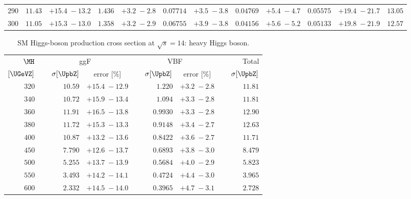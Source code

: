 \begin{landscape}
\begin{table}
\begin{center}
\begin{tabular}{r|rc|rc|rc|rc|rc|r}
 $ 290$ & $  11.43$ & $ +15.4 \; -\!13.2$ & $  1.436$ & $ +3.2 \; -\!2.8$ & $0.07714$ & $ +3.5 \; -\!3.8$ & $0.04769$ & $ +5.4 \; -\!4.7$ & $ 0.05575$ & $ +19.4 \; -\!21.7$ & $     13.05$ \\ 
 $ 300$ & $  11.05$ & $ +15.3 \; -\!13.0$ & $  1.358$ & $ +3.2 \; -\!2.9$ & $0.06755$ & $ +3.9 \; -\!3.8$ & $0.04156$ & $ +5.6 \; -\!5.2$ & $ 0.05133$ & $ +19.8 \; -\!21.9$ & $     12.57$ \\ 
\hline
	\end{tabular}
	\label{tab:XS14a}
	\end{center}
\end{table}
\end{landscape}


\begin{landscape}
\begin{table}
  \begin{center}
	\caption{SM Higgs-boson production cross section at 
	$\sqrt{s}=14$\UTeV: heavy Higgs boson.}    
    \small
	\begin{tabular}{r|rc|rc|r}
\hline
$\MH$ & \multicolumn{2}{c|}{ggF} & \multicolumn{2}{c|}{VBF} &  Total \\
$[\UGeVZ]$ & $~~~~\sigma [\UpbZ]$  & error [\%]
	       & $~~~~\sigma [\UpbZ]$  & error [\%]
	       & $~~~~\sigma [\UpbZ]$ \\
\hline
 $ 320$ & $  10.59$ & $ +15.4 \; -\!12.9$ & $  1.220$ & $ +3.2 \; -\!2.8$   & $      11.81$ \\ 
 $ 340$ & $  10.72$ & $ +15.9 \; -\!13.4$ & $  1.094$ & $ +3.3 \; -\!2.8$   & $      11.81$ \\ 
 $ 360$ & $  11.91$ & $ +16.5 \; -\!13.8$ & $ 0.9930$ & $ +3.3 \; -\!2.8$   & $      12.90$ \\ 
 $ 380$ & $  11.72$ & $ +15.3 \; -\!13.3$ & $ 0.9148$ & $ +3.4 \; -\!2.7$   & $      12.63$ \\ 
 $ 400$ & $  10.87$ & $ +13.2 \; -\!13.6$ & $ 0.8422$ & $ +3.6 \; -\!2.7$   & $      11.71$ \\ 
 $ 450$ & $  7.790$ & $ +12.6 \; -\!13.7$ & $ 0.6893$ & $ +3.8 \; -\!3.0$   & $      8.479$ \\ 
 $ 500$ & $  5.255$ & $ +13.7 \; -\!13.9$ & $ 0.5684$ & $ +4.0 \; -\!2.9$   & $      5.823$ \\ 
 $ 550$ & $  3.493$ & $ +14.2 \; -\!14.1$ & $ 0.4724$ & $ +4.4 \; -\!3.0$   & $      3.965$ \\ 
 $ 600$ & $  2.332$ & $ +14.5 \; -\!14.0$ & $ 0.3965$ & $ +4.7 \; -\!3.1$   & $      2.728$ \\ 

\end{tabular}
\end{center}
\end{table}
\end{landscape}
